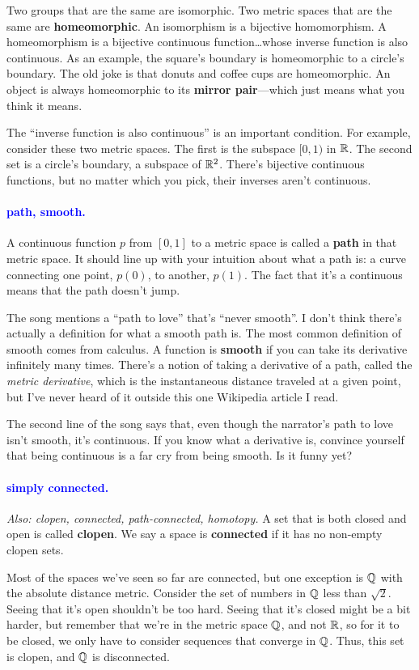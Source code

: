 \documentclass[11pt,paper=letter]{scrartcl}
\renewcommand{\bluebf}[1]{{\bfseries \color{Blue} #1}}
\renewcommand\wp[1]{\paragraph{\textcolor{Blue}{#1.}} \hspace{-1em}}
\newcommand\wl[1]{\label{w:#1}}
\newcommand\oww[1]{\textit{Also: #1.}}
\begin{document}
Two groups that are the same are isomorphic. Two metric spaces that are the same are \textbf{homeomorphic}. An isomorphism is a bijective homomorphism. A homeomorphism is a bijective continuous function\dots whose inverse function is also continuous. As an example, the square's boundary is homeomorphic to a circle's boundary. The old joke is that donuts and coffee cups are homeomorphic. An object is always homeomorphic to its \bluebf{mirror pair}---which just means what you think it means.

\begin{remboxed}
  The ``inverse function is also continuous'' is an important condition. For example, consider these two metric spaces. The first is the subspace $[0, 1)$ in $\mathbb R$. The second set is a circle's boundary, a subspace of $\mathbb R^2$. There's bijective continuous functions, but no matter which you pick, their inverses aren't continuous.
\end{remboxed}

\wp{path, smooth}
\wl{path}
\wl{smooth}
A continuous function $p$ from $[0, 1]$ to a metric space is called a \bluebf{path} in that metric space. It should line up with your intuition about what a path is: a curve connecting one point, $p(0)$, to another, $p(1)$. The fact that it's a continuous means that the path doesn't jump.

The song mentions a ``path to love'' that's ``never smooth''. I don't think there's actually a definition for what a smooth path is. The most common definition of smooth comes from calculus. A function is \bluebf{smooth} if you can take its derivative infinitely many times. There's a notion of taking a derivative of a path, called the \textit{metric derivative}, which is the instantaneous distance traveled at a given point, but I've never heard of it outside this one Wikipedia article I read.

\begin{exrboxed}
  The second line of the song says that, even though the narrator's path to love isn't smooth, it's continuous. If you know what a derivative is, convince yourself that being continuous is a far cry from being smooth. Is it funny yet?
\end{exrboxed}

\wp{simply connected}
\wl{simply connected}
\oww{clopen, connected, path-connected, homotopy}
A set that is both closed and open is called \textbf{clopen}. We say a space is \textbf{connected} if it has no non-empty clopen sets.

Most of the spaces we've seen so far are connected, but one exception is $\mathbb Q$ with the absolute distance metric. Consider the set of numbers in $\mathbb Q$ less than $\sqrt2$. Seeing that it's open shouldn't be too hard. Seeing that it's closed might be a bit harder, but remember that we're in the metric space $\mathbb Q$, and not $\mathbb R$, so for it to be closed, we only have to consider sequences that converge in $\mathbb Q$. Thus, this set is clopen, and $\mathbb Q$ is disconnected.
\end{document}
